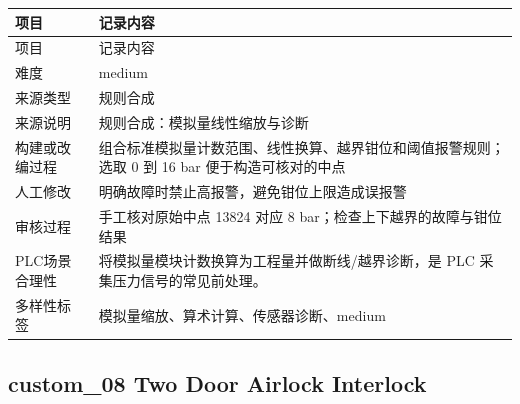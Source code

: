 \begin{longtable}{L{3.0cm}L{10.3cm}}

\toprule

项目 & 记录内容\\

\midrule

\endfirsthead

\toprule

项目 & 记录内容\\

\midrule

\endhead

难度 & medium\\

来源类型 & 规则合成\\

来源说明 & 规则合成：模拟量线性缩放与诊断\\

构建或改编过程 & 组合标准模拟量计数范围、线性换算、越界钳位和阈值报警规则；选取 0 到 16 bar 便于构造可核对的中点\\

人工修改 & 明确故障时禁止高报警，避免钳位上限造成误报警\\

审核过程 & 手工核对原始中点 13824 对应 8 bar；检查上下越界的故障与钳位结果\\

PLC场景合理性 & 将模拟量模块计数换算为工程量并做断线/越界诊断，是 PLC 采集压力信号的常见前处理。\\

多样性标签 & 模拟量缩放、算术计算、传感器诊断、medium\\

\bottomrule

\end{longtable}

\subsection{{\ttfamily custom\_08} Two Door Airlock Interlock}

